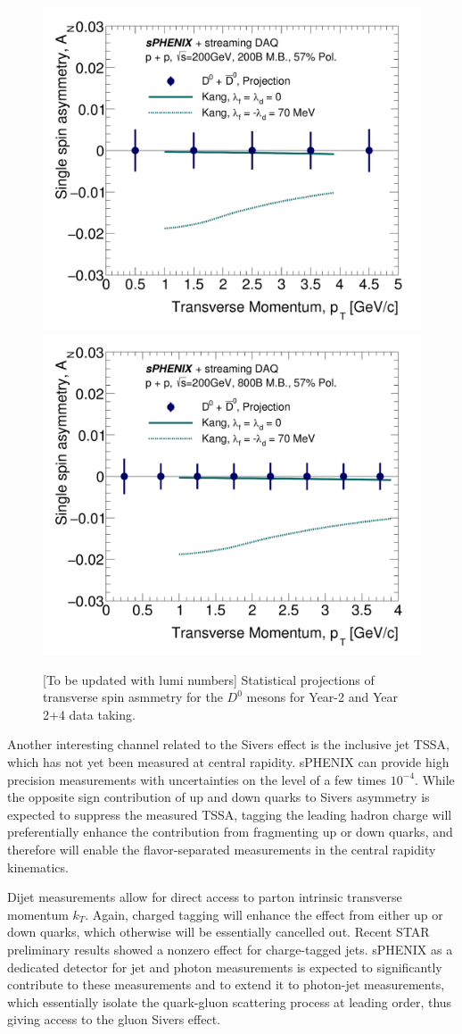 \begin{figure}[htbp]
\begin{center}
\includegraphics[width=.49\linewidth]{figs/RAA_DB_theory_root_AN_D0D0bar_pp200B.pdf}
\includegraphics[width=.49\linewidth]{figs/RAA_DB_theory_root_AN_D0D0bar.pdf}
\caption{[To be updated with lumi numbers] Statistical projections of
  transverse spin asmmetry for the $D^0$ mesons for Year-2 and Year
  2+4 data taking.} 
\label{fig:AN-D0}
\end{center}
\end{figure}

Another interesting channel related to the Sivers effect is the inclusive jet TSSA, which has not yet been measured at central rapidity. sPHENIX can provide high precision measurements with uncertainties on the level of a few times $10^{-4}$. While the opposite sign contribution of up and down quarks to Sivers asymmetry is expected to suppress the measured TSSA, tagging the leading hadron charge will preferentially enhance the contribution from fragmenting up or down quarks, and therefore will enable the flavor-separated measurements in the central rapidity kinematics.

Dijet measurements allow for direct access to parton intrinsic transverse momentum $k_T$. Again, charged tagging will enhance the effect from either up or down quarks, which otherwise will be essentially cancelled out. Recent STAR preliminary results showed a nonzero effect for charge-tagged jets. sPHENIX as a dedicated detector for jet and photon measurements is expected to significantly contribute to these measurements and to extend it to photon-jet measurements, which essentially isolate the quark-gluon scattering process at leading order, thus giving access to the gluon Sivers effect.

